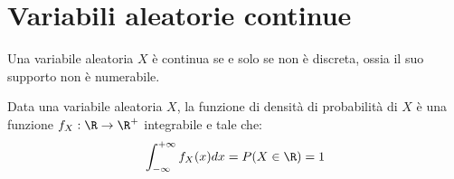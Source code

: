 %
%
%
%


\section{Variabili aleatorie continue}
\begin{defin}
	Una variabile aleatoria $X$ è continua se e solo se non è discreta, ossia il suo supporto non è numerabile.
\end{defin}

\begin{defin}
	Data una variabile aleatoria $X$, la funzione di densità di probabilità di $X$ è una funzione $f_X:\R\to\R^+$ integrabile e tale che:
	\begin{equation*}
		\int_{-\infty}^{+\infty} f_X(x)dx = P(X \in \R) = 1
	\end{equation*}
\end{defin}

